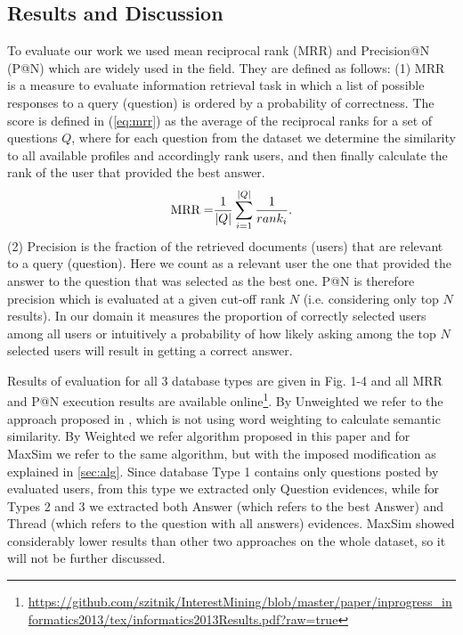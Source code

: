 \documentclass[conference]{IEEEtran}
\begin{document}
\subsection{Results and Discussion}
To evaluate our work we used mean reciprocal rank (MRR) and Precision@N (P@N) which are widely used in the field. They are defined as follows: (1) MRR is a measure to evaluate information retrieval task in which a list of possible responses to a query (question) is ordered by a probability of correctness. The score is defined in (\ref{eq:mrr}) as the average of the reciprocal ranks for a set of questions $Q$, where for each question from the dataset we determine the similarity to all available profiles and accordingly rank users, and then finally calculate the rank of the user that provided the best answer.
\begin{equation}
	\label{eq:mrr}
	{\rm MRR = }\frac{1}{|Q|}\sum_{i=1}^{|Q|}\frac{1}{rank_i}.
\end{equation}
(2) Precision is the fraction of the retrieved documents (users) that are relevant to a query (question). Here we count as a relevant user the one that provided the answer to the question that was selected as the best one. P@N is therefore precision which is evaluated at a given cut-off rank $N$ (i.e. considering only top $N$ results). In our domain it measures the proportion of correctly selected users among all users or intuitively a probability of how likely asking among the top $N$ selected users will result in getting a correct answer.

Results of evaluation for all 3 database types are given in Fig. 1-4 and all MRR and P@N execution results are available online\footnote{\url{https://github.com/szitnik/InterestMining/blob/master/paper/inprogress_informatics2013/tex/informatics2013Results.pdf?raw=true}}. By Unweighted we refer to the approach proposed in \cite{bib:1}, which is not using word weighting to calculate semantic similarity. By Weighted we refer algorithm proposed in this paper and for MaxSim we refer to the same algorithm, but with the imposed modification as explained in \ref{sec:alg}.  
Since database Type 1 contains only questions posted by evaluated users, from this type we extracted only Question evidences, while for Types 2 and 3 we extracted both Answer (which refers to the best Answer) and Thread (which refers to the question with all answers) evidences. MaxSim showed considerably lower results than other two approaches on the whole dataset, so it will not be further discussed.
\end{document}
